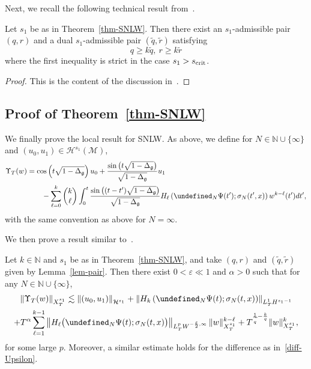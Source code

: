 \documentclass[AHL,Unicode,longabstracts,published]{cedram}
\newcommand{\scrit}{s_{\textup{crit}}}
\newcommand{\N}{\mathbb{N}}
\let\P= \undefined
\newcommand{\P}{\mathbf{P}}
\newcommand{\M}{\mathcal{M}}
\renewcommand{\H}{\mathcal{H}}
\newcommand{\g}{\mathfrak{g}}
\newcommand{\al}{\alpha}
\newcommand{\Dlg}{\Delta_{\g}}
\newcommand{\eps}{\varepsilon}
\newcommand{\s}{\sigma}
\newcommand{\les}{\lesssim}
\begin{document}
Next, we recall the following technical result from~\cite{GKO}.

\begin{lemm}\label{lem-pair}
Let $s_1$ be as in Theorem~\ref{thm-SNLW}. Then there exist an $s_1$-admissible pair $(q,r)$ and a dual $s_1$-admissible pair $(\widetilde{q},\widetilde{r})$ satisfying
\begin{equation}\label{prop-pair}
q\geq k\widetilde{q},~r\geq k\widetilde{r}
\end{equation}
where the first inequality is strict in the case $s_1>\scrit$.
\end{lemm}

\begin{proof}
This is the content of the discussion in~\cite[Subsection~3.1]{GKO}.
\end{proof}

\subsection{Proof of Theorem~\ref{thm-SNLW}}
We finally prove the local result for SNLW. As above, we define for $N\in\N\cup\{\infty\}$ and $(u_0,u_1)\in\H^{s_1}(\M)$,
\begin{align*}
\Upsilon_T(w)&=\cos\left(t\sqrt{1-\Dlg}\right)u_0+\frac{\sin\left(t\sqrt{1-\Dlg}\right)}{\sqrt{1-\Dlg}}u_1\\
&\qquad -\sum_{\ell=0}^{k}{\binom k \ell}\int_0^t\frac{\sin\left((t-t')\sqrt{1-\Dlg}\right)}{\sqrt{1-\Dlg}}H_{\ell}\left(\P_N\Psi(t');\s_N(t',x)\right)w^{k-\ell}(t')dt',
\end{align*}
with the same convention as above for $N=\infty$.

We then prove a result similar to~\cite[Proposition~3.5]{GKO}.

\begin{prop}\label{prop-subcrit}
Let $k\in\N$ and $s_1$ be as in Theorem~\ref{thm-SNLW}, and take $(q,r)$ and $(\widetilde{q},\widetilde{r})$ given by Lemma~\ref{lem-pair}. Then there exist $0<\eps\ll 1$ and $\al>0$ such that for any $N\in\N\cup\{\infty\}$,
\begin{multline}\label{fixpt-SNLW}
\left\|\Upsilon_T(w)\right\|_{X^{s_1}_T} \les \left\|(u_0,u_1)\right\|_{\H^{s_1}} + \left\|H_{k}\left(\P_N\Psi(t);\s_N(t,x)\right)\right\|_{L^1_TH^{s_1-1}}\\
+ T^{\al}\sum_{\ell=1}^{k-1}\left\|H_{\ell}\big(\P_N\Psi(t);\s_N(t,x)\big)\right\|_{L^p_TW^{-\frac\eps2,\infty}}\|w\|_{X^{s_1}_T}^{k-\ell}+ T^{\frac1{\widetilde{q}}-\frac{k}{q}}\|w\|_{X^{s_1}_T}^k,
\end{multline}
for some large $p$. Moreover, a similar estimate holds for the difference as in~\eqref{diff-Upsilon}.
\end{prop}
\end{document}
